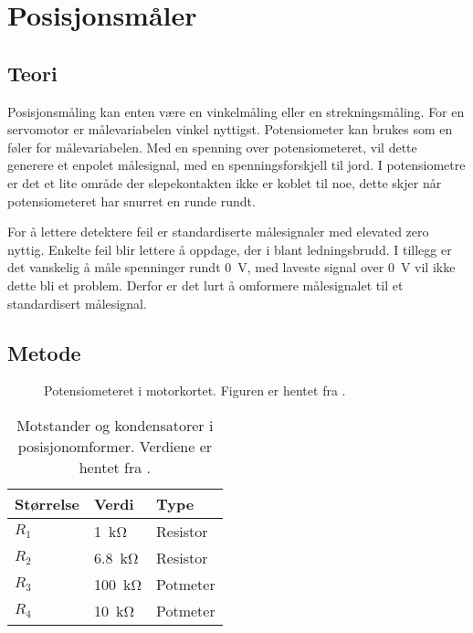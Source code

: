\section{Posisjonsmåler}
\label{sec:pos_måler}

\subsection{Teori}




Posisjonsmåling kan enten være en vinkelmåling eller en strekningsmåling. For en servomotor er målevariabelen vinkel nyttigst. Potensiometer kan brukes som en føler for målevariabelen. Med en spenning over potensiometeret, vil dette generere et enpolet målesignal, med en spenningsforskjell til jord. I potensiometre er det et lite område der slepekontakten ikke er koblet til noe, dette skjer når potensiometeret har snurret en runde rundt.


For å lettere detektere feil er standardiserte målesignaler med elevated zero nyttig. Enkelte feil blir lettere å oppdage, der i blant ledningsbrudd. I tillegg er det vanskelig å måle spenninger rundt \SI{0}{\volt}, med laveste signal over \SI{0}{\volt} vil ikke dette bli et problem. Derfor er det lurt å omformere målesignalet til et standardisert målesignal.






\subsection{Metode}

\begin{figure}[h]
    \centering
    
    \caption{Potensiometeret i motorkortet. Figuren er hentet fra \cite{AnalogMotorlabbOppgaver}.}
    \label{fig:posisjon_maler_potmeter}
\end{figure}

\begin{table}[h]
    \centering
    \caption{Motstander og kondensatorer i posisjonomformer. Verdiene er hentet fra \cite{AnalogMotorlabbOppgaver}.}
    \begin{tabular}{lll}
        \toprule
        Størrelse & Verdi & Type \\
		\midrule
        $R_1$ & \SI{1}{\kilo\ohm} & Resistor\\
        $R_2$ & \SI{6.8}{\kilo\ohm} & Resistor \\
        $R_3$ & \SI{100}{\kilo\ohm} & Potmeter \\
        $R_4$ & \SI{10}{\kilo\ohm} & Potmeter \\
        \bottomrule
    \end{tabular}
    \label{tab:Komponenter_i_posisjonsmaler}
\end{table}

